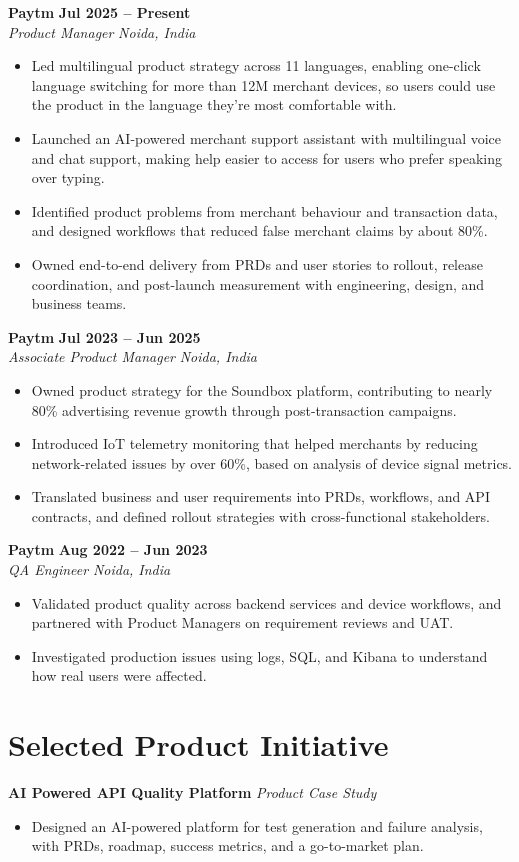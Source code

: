 \documentclass[10pt,a4paper]{article}
\newcommand{\entry}[4]{%
  \textbf{#1} \hfill \textbf{#2}\\
  \textit{#3} \hfill \textit{#4}\vspace{1pt}
}
\begin{document}
\entry{Paytm}{Jul 2025 -- Present}{Product Manager}{Noida, India}
\begin{itemize}
  \item Led multilingual product strategy across 11 languages, enabling one-click language switching for more than 12M merchant devices, so users could use the product in the language they're most comfortable with.
  \item Launched an AI-powered merchant support assistant with multilingual voice and chat support, making help easier to access for users who prefer speaking over typing.
  \item Identified product problems from merchant behaviour and transaction data, and designed workflows that reduced false merchant claims by about 80\%.
  \item Owned end-to-end delivery from PRDs and user stories to rollout, release coordination, and post-launch measurement with engineering, design, and business teams.
\end{itemize}

\vspace{3pt}
\entry{Paytm}{Jul 2023 -- Jun 2025}{Associate Product Manager}{Noida, India}
\begin{itemize}
  \item Owned product strategy for the Soundbox platform, contributing to nearly 80\% advertising revenue growth through post-transaction campaigns.
  \item Introduced IoT telemetry monitoring that helped merchants by reducing network-related issues by over 60\%, based on analysis of device signal metrics.
  \item Translated business and user requirements into PRDs, workflows, and API contracts, and defined rollout strategies with cross-functional stakeholders.
\end{itemize}

\vspace{3pt}
\entry{Paytm}{Aug 2022 -- Jun 2023}{QA Engineer}{Noida, India}
\begin{itemize}
  \item Validated product quality across backend services and device workflows, and partnered with Product Managers on requirement reviews and UAT.
  \item Investigated production issues using logs, SQL, and Kibana to understand how real users were affected.
\end{itemize}

\section*{Selected Product Initiative}
\textbf{AI Powered API Quality Platform} \hfill \textit{Product Case Study}
\begin{itemize}
  \item Designed an AI-powered platform for test generation and failure analysis, with PRDs, roadmap, success metrics, and a go-to-market plan.
\end{itemize}
\end{document}
